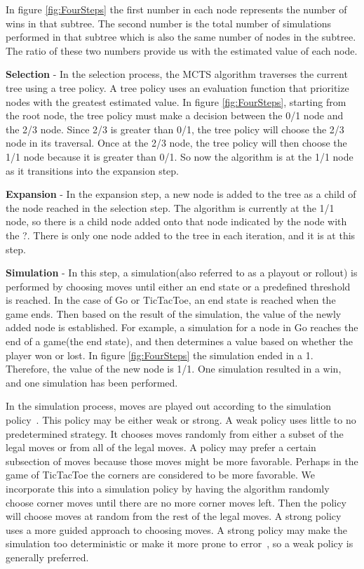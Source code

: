 \documentclass{sig-alternate}
\begin{document}
In figure \ref{fig:FourSteps} the first number in each node represents the number of wins in that subtree. The second number is the total number of simulations performed in that subtree which is also the same number of nodes in the subtree. The ratio of these two numbers provide us with the estimated value of each node.

\textbf{Selection} - In the selection process, the MCTS algorithm traverses the current tree using a tree policy. A tree policy uses an evaluation function that prioritize nodes with the greatest estimated value. In figure \ref{fig:FourSteps}, starting from the root node, the tree policy must make a decision between the 0/1 node and the 2/3 node. Since 2/3 is greater than 0/1, the tree policy will choose the 2/3 node in its traversal. Once at the 2/3 node, the tree policy will then choose the 1/1 node because it is greater than 0/1. So now the algorithm is at the 1/1 node as it transitions into the expansion step.

\textbf{Expansion} - In the expansion step, a new node is added to the tree as a child of the node reached in the selection step. The algorithm is currently at the 1/1 node, so there is a child node added onto that node indicated by the node with the ?. There is only one node added to the tree in each iteration, and it is at this step.

\textbf{Simulation} - In this step, a simulation(also referred to as a playout or rollout) is performed by choosing moves until either an end state or a predefined threshold is reached. In the case of Go or TicTacToe, an end state is reached when the game ends. Then based on the result of the simulation, the value of the newly added node is established. For example, a simulation for a node in Go reaches the end of a game(the end state), and then determines a value based on whether the player won or lost. In figure \ref{fig:FourSteps} the simulation ended in a 1. Therefore, the value of the new node is 1/1. One simulation resulted in a win, and one simulation has been performed.

In the simulation process, moves are played out according to the simulation policy~\cite{ActionSelection}. This policy may be either weak or strong. A weak policy uses little to no predetermined strategy. It chooses moves randomly from either a subset of the legal moves or from all of the legal moves. A policy may prefer a certain subsection of moves because those moves might be more favorable. Perhaps in the game of TicTacToe the corners are considered to be more favorable. We incorporate this into a simulation policy by having the algorithm randomly choose corner moves until there are no more corner moves left. Then the policy will choose moves at random from the rest of the legal moves. A strong policy uses a more guided approach to choosing moves. A strong policy may make the simulation too deterministic or make it more prone to error~\cite{TheGrandChallenge}, so a weak policy is generally preferred. 
\end{document}

